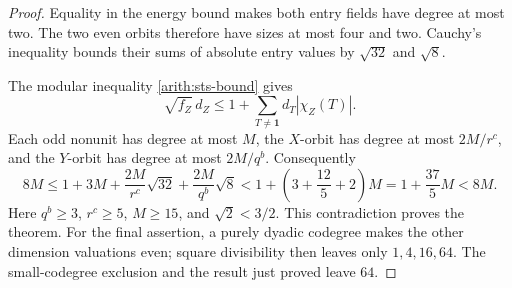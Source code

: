 \documentclass[11pt,a4paper]{article}
\numberwithin{equation}{section}
\newcommand{\one}{\mathbf1}
\begin{document}
\begin{proof}
Equality in the energy bound makes both entry fields have degree
at most two. The two even orbits therefore have sizes at most four and
two. Cauchy's inequality bounds their sums of absolute
entry values by $\sqrt{32}$ and $\sqrt8$.

The modular inequality \eqref{arith:sts-bound} gives
\[
  \sqrt{f_Z}\,d_Z
       \le 1+\sum_{T\ne\one}d_T|\chi_Z(T)|.
\]
Each odd nonunit has degree at most $M$, the $X$-orbit has
degree at most $2M/r^c$, and the $Y$-orbit has degree at most
$2M/q^b$. Consequently
\[
 8M\le 1+3M+\frac{2M}{r^c}\sqrt{32}
                    +\frac{2M}{q^b}\sqrt8
      <1+\left(3+\frac{12}{5}+2\right)M
      =1+\frac{37}{5}M<8M.
\]
Here $q^b\ge3$, $r^c\ge5$, $M\ge15$, and
$\sqrt2<3/2$. This contradiction proves the theorem.
For the final assertion, a purely dyadic codegree makes
the other dimension valuations even; square divisibility
then leaves only $1,4,16,64$. The small-codegree exclusion
and the result just proved leave $64$.
\end{proof}
\end{document}
